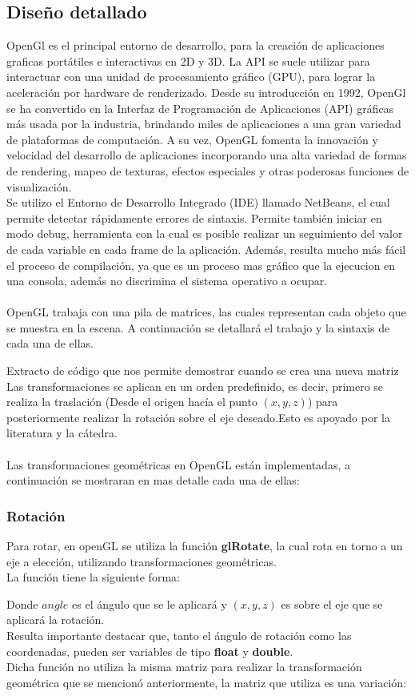\documentclass[12pt,journal,compsoc]{IEEEtran}
\begin{document}
\subsection{Diseño detallado}
OpenGl es el principal entorno de desarrollo, para la creación de aplicaciones graficas portátiles e interactivas en  2D y 3D. 
La API se suele utilizar para interactuar con una unidad de procesamiento gráfico (GPU), para lograr la aceleración por hardware de renderizado.
Desde su introducción en 1992, OpenGl se ha convertido en la Interfaz de Programación de Aplicaciones (API) gráficas más usada por la industria, brindando miles de aplicaciones a una gran variedad de plataformas de computación. A su vez, OpenGL fomenta la innovación y velocidad del desarrollo de aplicaciones incorporando una alta variedad de formas de rendering, mapeo de texturas, efectos especiales y otras poderosas funciones de visualización\cite{opengl}.
\\
Se utilizo el Entorno de Desarrollo Integrado (IDE) llamado NetBeans, el cual permite detectar rápidamente errores de sintaxis. Permite también iniciar en modo debug, herramienta con la cual es posible realizar un seguimiento del valor de cada variable en cada frame de la aplicación. Además, resulta mucho más fácil el proceso de compilación, ya que es un proceso mas gráfico que la ejecucion en una consola, además no discrimina el sistema operativo a ocupar.\\
\\
OpenGL trabaja con una pila de matrices, las cuales representan cada objeto que se muestra en la escena. A continuación se detallará el trabajo y la sintaxis de cada una de ellas.
%
 
%
Extracto de código que nos permite demostrar cuando se crea una nueva matriz\\
Las transformaciones se aplican en un orden predefinido, es decir, primero se realiza la traslación (Desde el origen hacía el punto $(x,y,z)$) para posteriormente realizar la rotación sobre el eje deseado.Esto es apoyado por la literatura y la cátedra.\\
\\
Las transformaciones geométricas en OpenGL están implementadas, a continuación se mostraran en mas detalle cada una de ellas:
%
\subsubsection{Rotación}
\label{rotacion}
Para rotar, en openGL se utiliza la función \textbf{glRotate}, la cual rota en torno a un eje a elección, utilizando transformaciones geométricas.\\La función tiene la siguiente forma:
%
 
%
Donde $angle$ es el ángulo que se le aplicará y $(x,y,z)$ es sobre el eje que se aplicará la rotación.\\Resulta importante destacar que, tanto el ángulo de rotación como las coordenadas, pueden ser variables de tipo \textbf{float} y \textbf{double}.
\\
Dicha función no utiliza la misma matriz para realizar la transformación geométrica que se mencionó anteriormente, la matriz que utiliza es una variación:\\
\end{document}
